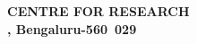 \begin{titlepage}
\begin{center}
	\vspace{0.1in}%
		
	\begin{figure}[!hb]
	\end{figure}
			
		\textbf{\large{
			CENTRE FOR RESEARCH\\ \vspace{0.3cm}
			\UniversityName, Bengaluru-560~029 \vspace{0.1cm}
		}} 
		\\
	\textbf{\ProjectDate}
\end{center}

\end{titlepage}

\clearpage